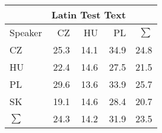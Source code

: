 \begin{tabular}{l|rrr|r}
\hline
 & \multicolumn{3}{c}{Latin Test Text} & \\
\hline
 Speaker   &   CZ &   HU &   PL &   $\sum$ \\
\hline
 CZ        & 25.3 & 14.1 & 34.9 &     24.8 \\
 HU        & 22.4 & 14.6 & 27.5 &     21.5 \\
 PL        & 29.6 & 13.6 & 33.9 &     25.7 \\
 SK        & 19.1 & 14.6 & 28.4 &     20.7 \\
\hline
 $\sum$   & 24.3 & 14.2 & 31.9 &     23.5 \\
\hline
\end{tabular}